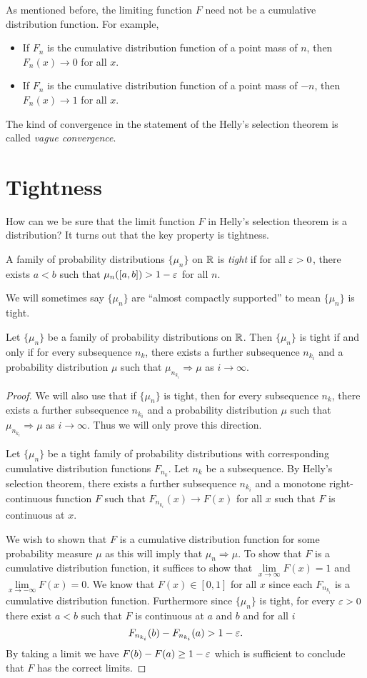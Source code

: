 \begin{ex}
    As mentioned before, the limiting function $F$ need not be a cumulative distribution function. For example,
    \begin{itemize}
        \item If $F_n$ is the cumulative distribution function of a point mass of $n$, then $F_n(x) \to 0$ for all $x$.
        \item If $F_n$ is the cumulative distribution function of a point mass of $-n$, then $F_n(x) \to 1$ for all $x$.
    \end{itemize}
\end{ex}
The kind of convergence in the statement of the Helly's selection theorem is called \emph{vague convergence}.
\section{Tightness}
How can we be sure that the limit function $F$ in Helly's selection theorem is a distribution? It turns out that the key property is tightness.
\begin{defn}
A family of probability distributions $\{\mu_n\}$ on ${\mathbb R}$ is \emph{tight} if for all $\varepsilon > 0$, there exists $a < b$ such that $\mu_n([a,b]) >1-\varepsilon$ for all $n$. 
\end{defn}
We will sometimes say $\{\mu_n\}$ are ``almost compactly supported'' to mean $\{\mu_n\}$ is tight.
\begin{thrm}
    Let $\{\mu_n\}$ be a family of probability distributions on ${\mathbb R}$. Then $\{\mu_n\}$ is tight if and only if for every subsequence $n_k$, there exists a further subsequence $n_{k_i}$ and a probability distribution $\mu$ such that $\mu_{n_{k_i}} \Rightarrow \mu$ as $i \to \infty$.
\end{thrm}
\begin{proof}
    We will also use that if $\{\mu_n\}$ is tight, then for every subsequence $n_k$, there exists a further subsequence $n_{k_i}$ and a probability distribution $\mu$ such that $\mu_{n_{k_i}} \Rightarrow \mu$ as $i \to \infty$. Thus we will only prove this direction.

    Let $\{\mu_n\}$ be a tight family of probability distributions with corresponding cumulative distribution functions $F_{n_k}$. Let $n_k$ be a subsequence. By Helly's selection theorem, there exists a further subsequence $n_{k_i}$ and a monotone right-continuous function $F$ such that $F_{n_{k_i}}(x) \to F(x)$ for all $x$ such that $F$ is continuous at $x$. 
    
    We wish to shown that $F$ is a cumulative distribution function for some probability measure $\mu$ as this will imply that $\mu_n \Rightarrow \mu$. To show that $F$ is a cumulative distribution function, it suffices to show that $\lim\limits_{x \to \infty}F(x)=1$ and $\lim\limits_{x \to - \infty}F(x)=0$. We know that $F(x) \in [0,1]$ for all $x$ since each $F_{n_{k_i}}$ is a cumulative distribution function. Furthermore since $\{\mu_n\}$ is tight, for every $\varepsilon>0$ there exist $a<b$ such that $F$ is continuous at $a$ and $b$ and for all $i$
    \[F_{n_{k_i}}(b)-F_{n_{k_i}}(a) > 1-\varepsilon.\]
    By  taking a limit we have $F(b)-F(a) \ge 1-\varepsilon$ which is sufficient to conclude that $F$ has the correct limits.
\end{proof}
